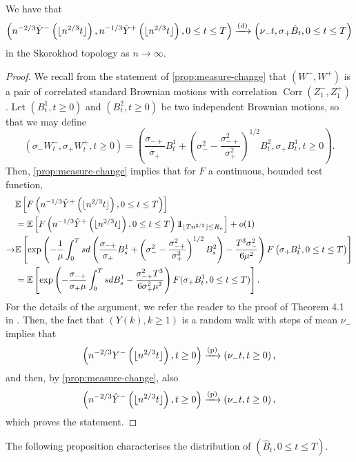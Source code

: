 \begin{proposition}\label{prop:convaftermeasurechange} 
 We have that
$$\left(n^{-2/3}\hat{Y}^-\left(\lfloor n^{2/3} t\rfloor\right), n^{-1/3}\hat{Y}^+\left(\lfloor  n^{2/3} t\rfloor\right), 0\leq t \leq T \right) \xrightarrow[]{\mathrm{(d)}} \left( \nu_- t, \sigma_+\hat{B}_t, 0 \leq t \leq T \right)$$
in the Skorokhod topology as $n\to \infty$.
\end{proposition}
\begin{proof}
 We recall from the statement of \cref{prop:measure-change} that $(W^-,W^+)$ is a pair of correlated standard Brownian motions with correlation $\operatorname{Corr}(Z_1^-,Z_1^+)$. 
Let $(B^1_t,t\geq 0)$ and $(B^2_t,t\geq 0)$ be two independent Brownian motions, so that we may define $$(\sigma_-W^-_t,\sigma_+W^+_t,t\geq 0)=\left(\frac{\sigma_{-+}}{\sigma_+}B_t^1+\left(\sigma_-^2-\frac{\sigma_{-+}^2}{\sigma_+^2}\right)^{1/2} B_t^2, \sigma_+ B_t^1, t\geq 0\right).$$ 
 Then, \cref{prop:measure-change} implies that for $F$ a continuous, bounded test function, 
 \begin{align*}&\E\left[F\left(n^{-1/3}\hat{Y}^+\left(\lfloor n^{2/3}t\rfloor\right), 0\leq t \leq T \right) \right]\\
 &=\E\left[F\left(n^{-1/3}\hat{Y}^+\left(\lfloor n^{2/3}t\rfloor\right), 0\leq t \leq T \right)\one_{\lfloor Tn^{2/3}\rfloor \leq R_n} \right]+o(1)
 \\\to& \E\left[\exp\left(-\frac{1}{\mu}\int_0^Tsd\left(\frac{\sigma_{-+}}{\sigma_+}B_s^1+\left(\sigma_-^2-\frac{\sigma_{-+}^2}{\sigma_+^2}\right)^{1/2}B_s^2\right) - \frac{T^3 \sigma_-^2}{6\mu^2}\right) F\left(\sigma_+ B_t^1, 0\leq t \leq T\right)\right]\\
 &=\E\left[\exp\left(-\frac{\sigma_{-+}}{\sigma_+ \mu} \int_0^T s dB^1_s -\frac{\sigma_{-+}^2 T^3}{6\sigma_+^2 \mu^2}\right)F(\sigma_+ B^1_t,   0\leq t \leq T)\right].\end{align*}
 For the details of the argument, we refer the reader to the proof of Theorem 4.1 in \cite{conchon--kerjanStableGraphMetric2020}. Then, the fact that $(Y(k),k\geq 1)$ is a random walk with steps of mean $\nu_-$ implies that
 $$\left(n^{-2/3}Y^-\left(\lfloor n^{2/3}t\rfloor\right),t\geq 0\right)\xrightarrow[]{\mathrm{(p)}}\left(\nu_- t,t\geq 0\right),$$
 and then, by \cref{prop:measure-change}, also 
 $$\left(n^{-2/3}\hat{Y}^-\left(\lfloor n^{2/3}t\rfloor\right),t\geq 0\right)\xrightarrow[]{\mathrm{(p)}}\left(\nu_- t,t\geq 0\right),$$
 which proves the statement.
 \end{proof}
 The following proposition characterises the distribution of $(\hat{B}_t, {0\leq t\leq T})$.
